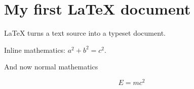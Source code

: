 \documentclass{article}
\begin{document}
\section*{My first LaTeX document}
LaTeX turns a text source into a typeset document.

Inline mathematics: \(a^2+b^2=c^2\).

And now normal mathematics

\[ E = mc^2 \]
\end{document}
